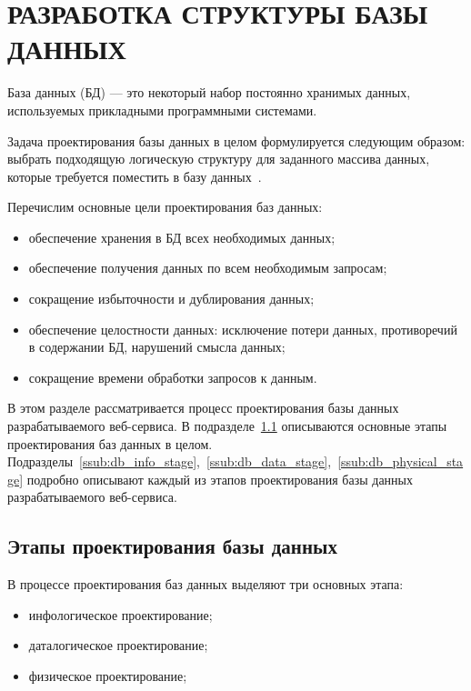 \section[Разработка структуры БД]{РАЗРАБОТКА СТРУКТУРЫ БАЗЫ ДАННЫХ}
\label{sub:db_structure}

База данных (БД) --- это некоторый набор постоянно хранимых данных,
используемых прикладными программными системами.

Задача проектирования базы данных в целом формулируется
следующим образом: выбрать подходящую логическую структуру для заданного
массива данных, которые требуется поместить в базу данных~\cite{date05}.

Перечислим основные цели проектирования баз данных:
\begin{itemize}
\item
  обеспечение хранения в БД всех необходимых данных;
\item
  обеспечение получения данных по всем необходимым запросам;
\item
  сокращение избыточности и дублирования данных;
\item
  обеспечение целостности данных: исключение потери данных, противоречий в
  содержании БД, нарушений смысла данных;
\item
  сокращение времени обработки запросов к данным.
\end{itemize}

В этом разделе рассматривается процесс проектирования базы данных разрабатываемого
веб-сервиса.
В подразделе~\ref{ssub:db_structure_stages} описываются основные этапы проектирования
баз данных в целом.
Подразделы~\ref{ssub:db_info_stage},~\ref{ssub:db_data_stage},~\ref{ssub:db_physical_stage}
подробно описывают каждый из этапов проектирования базы данных разрабатываемого веб-сервиса.

\subsection{Этапы проектирования базы данных}
\label{ssub:db_structure_stages}

В процессе проектирования баз данных выделяют три основных этапа:
\begin{itemize}
\item инфологическое проектирование;
\item даталогическое проектирование;
\item физическое проектирование;
\end{itemize}

